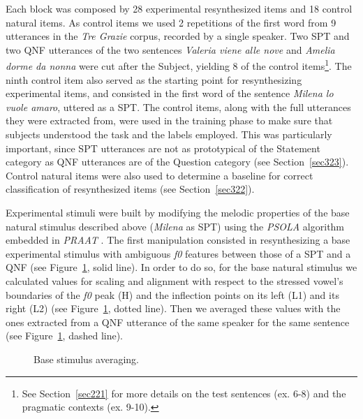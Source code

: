 Each block was composed by 28 experimental resynthesized items and 18 control natural items. As control items we used 2 repetitions of the first word from 9 utterances in the \textit{Tre Grazie} corpus, recorded by a single speaker. Two SPT and two QNF utterances of the two sentences \textit{Valeria viene alle nove} and \textit{Amelia dorme da nonna} were cut after the Subject, yielding 8 of the control items\footnote{See Section~\ref{sec221} for more details on the test sentences (ex. 6-8) and the pragmatic contexts (ex. 9-10).}. The ninth control item also served as the starting point for resynthesizing experimental items, and consisted in the first word of the sentence \textit{Milena lo vuole amaro}, uttered as a SPT. The control items, along with the full utterances they were extracted from, were used in the training phase to make sure that subjects understood the task and the labels employed. This was particularly important, since SPT utterances are not as prototypical of the Statement category as QNF utterances are of the Question category (see Section~\ref{sec323}). Control natural items were also used to determine a baseline for correct classification of resynthesized items (see Section~\ref{sec322}). 

Experimental stimuli were built by modifying the melodic properties of the base natural stimulus described above (\textit{Milena} as SPT) using the \textit{PSOLA} algorithm \citep{moulines1990pitchsyncronous} embedded in \textit{PRAAT} \citep{boersma2008praat}. The first manipulation consisted in resynthesizing a base experimental stimulus with ambiguous \textit{f0} features between those of a SPT and a QNF (see Figure~\ref{fig303}, solid line). In order to do so, for the base natural stimulus we calculated values for scaling and alignment with respect to the stressed vowel’s boundaries of the \textit{f0} peak (H) and the inflection points on its left (L1) and its right (L2) (see Figure~\ref{fig303}, dotted line). Then we averaged these values with the ones extracted from a QNF utterance of the same speaker for the same sentence (see Figure~\ref{fig303}, dashed line). 

\begin{figure}
\centering
{}
\caption{Base stimulus averaging.}
\label{fig303}\end{figure}

